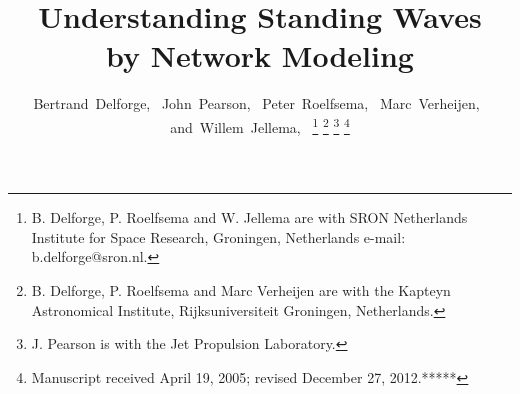 \documentclass[journal]{IEEEtran}
\begin{document}
%
\title{Understanding Standing Waves\\by Network Modeling}
%
%
%

\author{Bertrand~Delforge,~
        John~Pearson,~
        Peter~Roelfsema,~
        Marc~Verheijen,~
        and~Willem~Jellema,~%
\thanks{B. Delforge, P. Roelfsema and W. Jellema are with SRON Netherlands Institute for Space Research, Groningen, Netherlands e-mail: b.delforge@sron.nl.}%
\thanks{B. Delforge, P. Roelfsema and Marc Verheijen are with the Kapteyn Astronomical Institute, Rijksuniversiteit Groningen, Netherlands.}%
\thanks{J. Pearson is with the Jet Propulsion Laboratory.}%
\thanks{Manuscript received April 19, 2005; revised December 27, 2012.*****}}


% 
%
\end{document}
